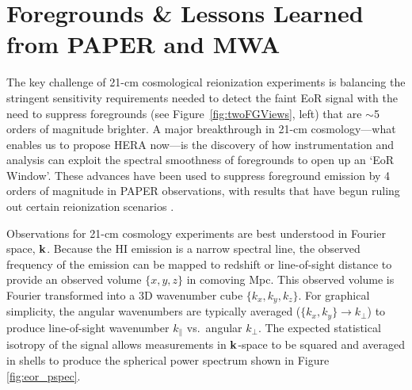 \documentclass[preprint]{aastex}
\def\kperp{k_{\bot}}
\def\kpar{k_{\|}}
\def\k{{\bf k}}
\def\HI{{H{\small I }}}
\begin{document}

\vspace{-0.25in}
\section{Foregrounds \& Lessons Learned from PAPER and MWA}
\label{LessonsSec}

The key challenge of 21-cm cosmological reionization experiments is 
balancing the stringent sensitivity requirements needed to detect the faint EoR signal
with the need to suppress
foregrounds (see Figure~\ref{fig:twoFGViews}, left) that are $\sim$5 orders of magnitude brighter.
A major breakthrough in 21-cm cosmology---what enables us to propose HERA now---is 
the discovery of how 
instrumentation and analysis can exploit the 
spectral smoothness of foregrounds
to open up an `EoR Window'.  
These advances have been used to suppress foreground emission by 4
orders of magnitude in PAPER observations,
with results that have begun ruling out certain reionization scenarios
\citep{parsons_et_al2013}.

Observations for 21-cm cosmology experiments are best understood in
Fourier space, $\k$.  Because the \HI emission is a
narrow spectral line, the observed frequency of the emission can be mapped to
redshift or line-of-sight distance to provide an observed volume $\{x,y,z\}$ in
comoving Mpc. This observed volume is Fourier transformed into a 3D
wavenumber cube $\{k_{x}, k_{y}, k_{z}\}$. For graphical simplicity, the angular
wavenumbers are typically averaged ($\{k_{x},k_{y}\}\rightarrow\kperp$) to
produce line-of-sight wavenumber $\kpar$ vs.\ angular $\kperp$. 
The expected statistical isotropy of the signal allows measurements in $\k$-space to be
squared and averaged in shells to produce the spherical power spectrum
shown in Figure \ref{fig:eor_pspec}.
\end{document}
